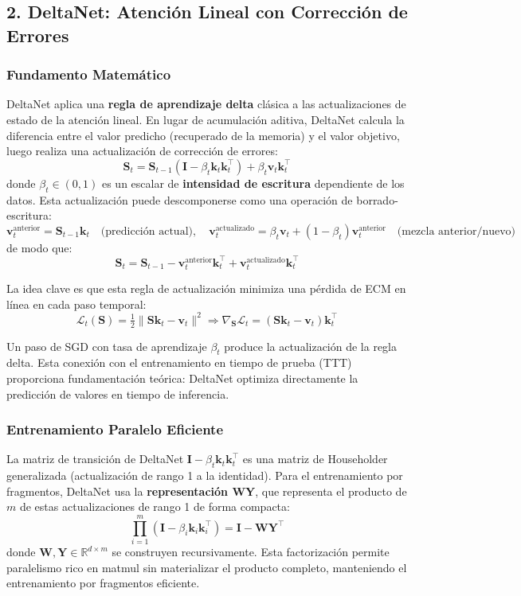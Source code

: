 \documentclass[11pt,a4paper]{article}
\begin{document}
\subsection{2. DeltaNet: Atención Lineal con Corrección de Errores}

\subsubsection{Fundamento Matemático}

DeltaNet \citep{yang_deltanet_2024} aplica una \textbf{regla de aprendizaje delta} clásica a las actualizaciones de estado de la atención lineal. En lugar de acumulación aditiva, DeltaNet calcula la diferencia entre el valor predicho (recuperado de la memoria) y el valor objetivo, luego realiza una actualización de corrección de errores:
\[
\mathbf{S}_t = \mathbf{S}_{t-1}(\mathbf{I} - \beta_t \mathbf{k}_t \mathbf{k}_t^\top) + \beta_t \mathbf{v}_t \mathbf{k}_t^\top
\]
donde $\beta_t \in (0,1)$ es un escalar de \textbf{intensidad de escritura} dependiente de los datos. Esta actualización puede descomponerse como una operación de borrado-escritura:
\[
\mathbf{v}_t^\text{anterior} = \mathbf{S}_{t-1} \mathbf{k}_t \quad \text{(predicción actual)}, \quad
\mathbf{v}_t^\text{actualizado} = \beta_t \mathbf{v}_t + (1-\beta_t)\mathbf{v}_t^\text{anterior} \quad \text{(mezcla anterior/nuevo)}
\]
de modo que:
\[
\mathbf{S}_t = \mathbf{S}_{t-1} - \mathbf{v}_t^\text{anterior}\mathbf{k}_t^\top + \mathbf{v}_t^\text{actualizado}\mathbf{k}_t^\top
\]

La idea clave es que esta regla de actualización minimiza una pérdida de ECM en línea en cada paso temporal:
\[
\mathcal{L}_t(\mathbf{S}) = \tfrac{1}{2}\|\mathbf{S}\mathbf{k}_t - \mathbf{v}_t\|^2 \Rightarrow \nabla_{\mathbf{S}} \mathcal{L}_t = (\mathbf{S}\mathbf{k}_t - \mathbf{v}_t)\mathbf{k}_t^\top
\]

Un paso de SGD con tasa de aprendizaje $\beta_t$ produce la actualización de la regla delta. Esta conexión con el entrenamiento en tiempo de prueba (TTT) proporciona fundamentación teórica: DeltaNet optimiza directamente la predicción de valores en tiempo de inferencia.

\subsubsection{Entrenamiento Paralelo Eficiente}

La matriz de transición de DeltaNet $\mathbf{I} - \beta_t \mathbf{k}_t \mathbf{k}_t^\top$ es una matriz de Householder generalizada (actualización de rango 1 a la identidad). Para el entrenamiento por fragmentos, DeltaNet usa la \textbf{representación WY}, que representa el producto de $m$ de estas actualizaciones de rango 1 de forma compacta:
\[
\prod_{i=1}^{m} (\mathbf{I} - \beta_i \mathbf{k}_i \mathbf{k}_i^\top) = \mathbf{I} - \mathbf{W}\mathbf{Y}^\top
\]
donde $\mathbf{W}, \mathbf{Y} \in \mathbb{R}^{d \times m}$ se construyen recursivamente. Esta factorización permite paralelismo rico en matmul sin materializar el producto completo, manteniendo el entrenamiento por fragmentos eficiente.
\end{document}
